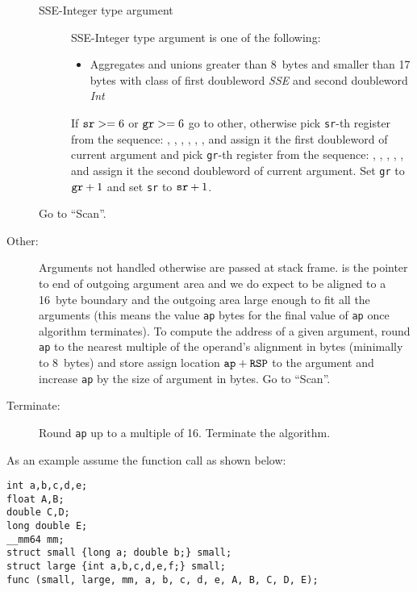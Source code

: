 \begin{description}
\begin{description}
    \item[SSE-Integer type argument]
      SSE-Integer type argument is one of the following:
      \begin{itemize}
        \item Aggregates and unions greater than 8~bytes and smaller
          than 17 bytes with class of first doubleword \emph{SSE}
          and second doubleword \emph{Int}
      \end{itemize}
      If $\verb|sr| >= 6$ or $\verb|gr| >= 6$ go to other, otherwise
      pick \verb|sr|-th register from the sequence: ,
      , , , , ,
       and assign it the first doubleword of current argument and
      pick \verb|gr|-th register from the sequence: \RAX, \RDX, \RCX,
      \RBX, \RSI, \RDI{} and assign it the second doubleword of current
      argument.  Set \verb|gr| to $\verb|gr|+1$ and set \verb|sr| to
      $\verb|sr|+1$.

   \end{description}
   Go to ``Scan''.

  \item[Other:]

    Arguments not handled otherwise are passed at stack frame. \RSP{} is the
    pointer to end of outgoing argument area and we do expect \RSP{} to be
    aligned to a 16~byte boundary and the outgoing area large enough to fit all
    the arguments (this means the value \verb|ap| bytes for the final value of
    \verb|ap| once algorithm terminates).  To compute the address of a given argument,
    round \verb|ap| to the nearest multiple of the operand's alignment in bytes
    (minimally to 8~bytes) and
    store assign location $\verb|ap|+\RSP$ to the argument and increase \verb|ap| by
    the size of argument in bytes.
    Go to ``Scan''.

  \item[Terminate:]
    Round \verb|ap| up to a multiple of 16. Terminate the algorithm.
\end{description}

As an example assume the function call as shown below:

\begin{verbatim}
int a,b,c,d,e;
float A,B;
double C,D;
long double E;
__mm64 mm;
struct small {long a; double b;} small;
struct large {int a,b,c,d,e,f;} small;
func (small, large, mm, a, b, c, d, e, A, B, C, D, E);
\end{verbatim}


